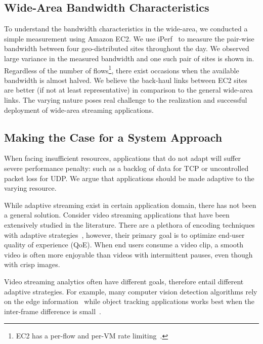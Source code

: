 \subsection{Wide-Area Bandwidth Characteristics}
\label{sec:making-case-adapt}

To understand the bandwidth characteristics in the wide-area, we conducted a
simple measurement using Amazon EC2. We use iPerf~\cite{iperf} to measure the
pair-wise bandwidth between four geo-distributed sites throughout the day. We
observed large variance in the measured bandwidth and one such pair of sites is
shown in. Regardless of the number of flows\footnote{EC2 has a per-flow and
  per-VM rate limiting~\cite{zhang2016guaranteeing}.}, there exist occasions
when the available bandwidth is almost halved. We believe the back-haul links
between EC2 sites are better (if not at least representative) in comparison to
the general wide-area links. The varying nature poses real challenge to the
realization and successful deployment of wide-area streaming applications.

\subsection{Making the Case for a System Approach}
\label{sec:bat}

When facing insufficient resources, applications that do not adapt will suffer
severe performance penalty: such as a backlog of data for TCP or uncontrolled
packet loss for UDP. We argue that applications should be made adaptive to the
varying resource.

While adaptive streaming exist in certain application domain, there has not been
a general solution. Consider video streaming applications that have been
extensively studied in the literature. There are a plethora of encoding
techniques~\cite{richardson2011h, grange2016vp9} with adaptive
strategies~\cite{yin2015control, michalos2012dynamic, pantos2016http}, however,
their primary goal is to optimize end-user quality of experience (QoE).  When
end users consume a video clip, a smooth video is often more enjoyable than
videos with intermittent pauses, even though with crisp images.

Video streaming analytics often have different goals, therefore entail different
adaptive strategies. For example, many computer vision detection algorithms rely
on the edge information~\cite{canny1986computational, lowe2004distinctive,
  viola2001rapid} while object tracking applications works best when the
inter-frame difference is small~\cite{allen2004object}.

